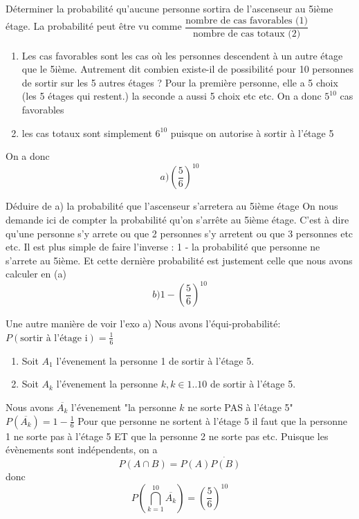 	\begin{exo}
		\begin{subexo} {Déterminer la probabilité qu’aucune personne sortira de l’ascenseur au 5ième étage.}
			La probabilité peut être vu comme $\dfrac{\text{nombre de cas favorables (1)}}{\text{nombre de cas totaux (2)}}$
			
				\begin{enumerate}[label=(\arabic*)]
					\item Les cas favorables sont les cas où les personnes descendent à un autre étage que le 5ième.
					Autrement dit combien existe-il de possibilité pour 10 personnes de sortir sur les 5 autres étages ?
					Pour la première personne, elle a 5 choix (les 5 étages qui restent.) la seconde a aussi 5 choix etc etc.
					On a donc $5^{10}$ cas favorables
					\item les cas totaux sont simplement $6^{10}$ puisque on autorise à sortir à l'étage 5
				\end{enumerate}
				On a donc $$a) \left(\frac{5}{6}\right)^{10}$$
			
		\end{subexo}
		\begin{subexo}{Déduire de a) la probabilité que l'ascenseur s'arretera au 5ième étage}
				On nous demande ici de compter la probabilité qu'on s'arrête au 5ième étage. C'est à dire qu'une personne s'y arrete ou que 2 personnes s'y arretent ou que 3 personnes etc etc.
			Il est plus simple de faire l'inverse : 1 - la probabilité que personne ne s'arrete au 5ième. Et cette dernière probabilité est justement celle que nous avons calculer en (a)
			$$b)1 - \left( \dfrac{5}{6} \right)^{10}$$
			\end{subexo}
		\begin{subexo}{Une autre manière de voir l'exo a)}
			Nous avons l'équi-probabilité: $ P({\text{sortir à l'étage i}}) = \frac{1}{6}$
			\begin{enumerate}
				\item 			Soit $A_1$ l'évenement la personne 1 de sortir à l'étage 5. 
\item 			Soit $A_k$ l'évenement la personne $k, k\in 1..10$ de sortir à l'étage 5.

			\end{enumerate}
			Nous avons $\overline{A_k}$ l'évenement "la personne $k$ ne sorte PAS à l'étage 5" $P(\overline{A_k}) = 1 -\frac{1}{6}$
			Pour que personne ne sortent à l'étage 5 il faut que la personne 1 ne sorte pas à l'étage 5 ET que la personne 2 ne sorte pas etc.
			\newline
			Puisque les évènements sont indépendents, on a $$P(A \cap B) =P(A) \dot{ P(B)} $$
			donc $$ P\left( \bigcap_{k=1}^{10}\overline{A_{k}}\right) = \left(\frac{5}{6}\right)^{10}$$
		\end{subexo}
	\end{exo}
	
